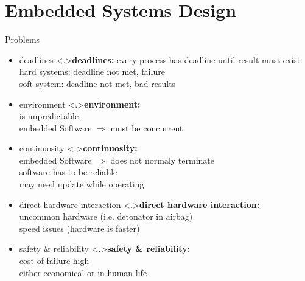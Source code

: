 \documentclass[ngerman={babel}, utf8, bigger, xcolor={table,dvipsnames}, ompress, hyperref={bookmarks,colorlinks}]{beamer}
\begin{document}
\section{Embedded Systems Design}
\begin{frame}{Problems}
	\begin{itemize}
		\item deadlines
		\note<.>{\textbf{deadlines:} every process has deadline until result must exist \\ hard systems: deadline not met, failure\\ soft system: deadline not met, bad results}
		\item environment
		\note<.>{\textbf{environment:}\\ is unpredictable \\ embedded Software $\Rightarrow$ must be concurrent}
		\item continuosity
		\note<.>{\textbf{continuosity:}\\ embedded Software $\Rightarrow$ does not normaly terminate \\ software has to be reliable \\ may need update while operating}
		\item direct hardware interaction
		\note<.>{\textbf{direct hardware interaction:}\\ uncommon hardware (i.e. detonator in airbag) \\ speed issues (hardware is faster)}
		\item safety \& reliability
		\note<.>{\textbf{safety \& reliability:}\\ cost of failure high \\ either economical or in human life}
	\end{itemize}
\end{frame}
\end{document}
